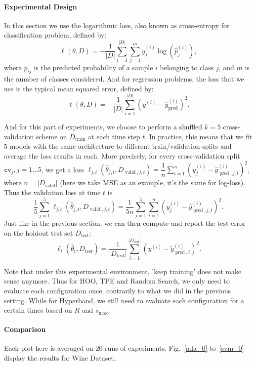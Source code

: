 \documentclass[runningheads,a4paper]{llncs}
\begin{document}
\paragraph{\textbf{Experimental Design}} In this section we use the logarithmic loss, also known as cross-entropy for classification problem, defined by:
\[
\ell(\theta, D) = - \frac{1}{|D|} \sum_{i=1}^{|D|} \sum_{j=1}^m y^{(i)}_{j}\log(\hat{p}^{(i)}_{j}),
\]
where $\hat{p}_{ij}$ is the predicted probability of a sample $i$ belonging to class $j$, and $m$ is the number of classes considered. And for regression problems, the loss that we use is the typical mean squared error, defined by:
\[
\ell(\theta, D) = - \frac{1}{|D|} \sum_{i=1}^{|D|} \left(y^{(i)} - \hat{y}^{(i)}_{\operatorname{pred}}\right)^2.
\]

And for this part of experiments, we choose to perform a shuffled $k=5$ cross-validation scheme on $D_{\operatorname{train}}$ at each time step $t$. In practice, this means that we fit $5$ models with the same architecture to different train/validation splits and average the loss results in each. More precisely, for every cross-validation split 
$\mathtt{cv}_j,j=1\ldots5$, we get a loss $\ell_{j,t}(\hat{\theta}_{j,t}, D_{\operatorname{valid},j,t}) = \dfrac{1}{n} \sum^{n}_{i=1} \left(y^{(i)}_{j} - \hat{y}^{(i)}_{\operatorname{pred},j,t}\right)^2$, where $n=|D_{\operatorname{valid}}|$ (here we take MSE as an example, it's the same for log-loss). Thus the validation loss at time $t$ is
\[
\frac{1}{5}\sum_{j=1}^{5}\ell_{j,t}(\hat{\theta}_{j,t}, D_{\operatorname{valid},j,t}) = \frac{1}{5n}\sum_{j=1}^{5} \sum_{i=1}^n \left(y^{(i)}_{j} - \hat{y}^{(i)}_{\operatorname{pred},j,t}\right)^2.
\]
Just like in the previous section, we can then compute and report the test error on the holdout test set $D_{\operatorname{test}}$:
\[
\ell_{t}(\hat{\theta}_t, D_{\operatorname{test}}) = \frac{1}{|D_{\operatorname{test}}|} \sum_{i=1}^{|D_{\operatorname{test}}|} \left(y^{(i)} - \tilde{y}^{(i)}_{\operatorname{pred},t}\right)^2.
\]

Note that under this experimental environment, 'keep training' does not make sense anymore. Thus for HOO, TPE and Random Search, we only need to evaluate each configuration once, contrarily to what we did in the previous setting. While for Hyperband, we still need to evaluate each configuration for a certain times based on $R$ and $s_{\max}$.

\paragraph{\textbf{Comparison}} Each plot here is averaged on 20 runs of experiments. Fig.~\ref{ada_0} to~\ref{svm_0} display the results for Wine Dataset.
\end{document}
